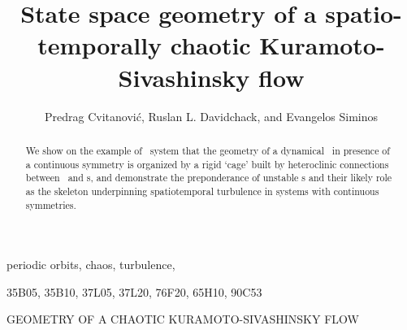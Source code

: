 \documentclass{siamltex}          %
\begin{document}
                \title{
State space geometry of a spatio-temporally chaotic
Kuramoto-Sivashinsky flow
                 }
                  \author{
Predrag Cvitanovi\'c\footnotemark[1],
Ruslan L. Davidchack\footnotemark[2],
    and
Evangelos Siminos\footnotemark[1]
                    }


                \maketitle

\renewcommand{\thefootnote}{\fnsymbol{footnote}}
\renewcommand{\thefootnote}{\arabic{footnote}}

                \begin{abstract}
We show on the example of \KS\ system
that the geometry of a dynamical \statesp\ in presence of
a continuous symmetry is organized by
a rigid `cage' built by heteroclinic connections
between \eqva\ and \rpo s, and demonstrate the
preponderance of unstable \rpo s and their likely
role as the skeleton underpinning spatiotemporal turbulence in
systems with continuous symmetries.
                \end{abstract}

\begin{keywords}
periodic orbits, chaos, turbulence, {\KSe}
\end{keywords}

\begin{AMS}
35B05, 35B10, 37L05, 37L20, 76F20, 65H10, 90C53
\end{AMS}

\pagestyle{myheadings}
\thispagestyle{plain}
         {GEOMETRY OF A CHAOTIC KURAMOTO-SIVASHINSKY FLOW}
\end{document}
